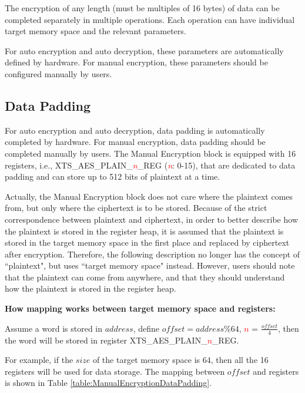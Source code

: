 \documentclass[main\_\_EN.tex]{subfiles}
\begin{document}
The encryption of any length (must be multiples of 16 bytes) of data can be completed separately in multiple operations. Each operation can have individual target memory space and the relevant parameters.

For auto encryption and auto decryption, these parameters are automatically defined by hardware. For manual encryption, these parameters should be configured manually by users.


\subsection{Data Padding} \label{XTS data rule}
For auto encryption and auto decryption, data padding is automatically completed by hardware. For manual encryption, data padding should be completed manually by users. The Manual Encryption block is equipped with 16 registers, i.e., XTS\_AES\_PLAIN\_\textcolor{red}{\it{n}}\_REG (\textcolor{red}{\it{n}}: 0-15), that are dedicated to data padding and can store up to 512 bits of plaintext at a time.

Actually, the Manual Encryption block does not care where the plaintext comes from, but only where the ciphertext is to be stored. Because of the strict correspondence between plaintext and ciphertext, in order to better describe how the plaintext is stored in the register heap, it is assumed that the plaintext is stored in the target memory space in the first place and replaced by ciphertext after encryption. Therefore, the following description no longer has the concept of ``plaintext", but uses ``target memory space" instead. However, users should note that the plaintext can come from anywhere, and that they should understand how the plaintext is stored in the register heap.

{\bfseries How mapping works between target memory space and registers:}

Assume a word is stored in \begin{math} address\end{math}, define \begin{math} offset = address \% 64 \end{math}, \textcolor{red}{\it{$n$}} =  \begin{math} \frac{offset}{4} \end{math}, then the word will be stored in register XTS\_AES\_PLAIN\_\textcolor{red}{\it{$n$}}\_REG.

For example, if the \begin{math}size\end{math} of the target memory space is 64, then all the 16 registers will be used for data storage. The mapping between \begin{math} offset\end{math} and registers is shown in Table \ref{table:ManualEncryptionDataPadding}.
\end{document}
